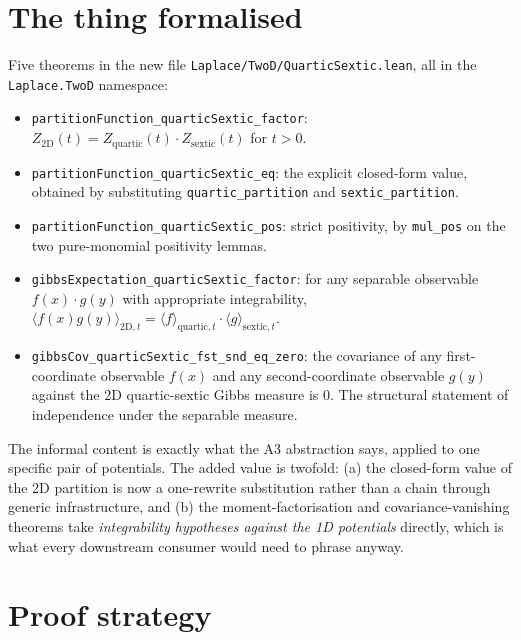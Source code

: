 \documentclass[11pt]{article}
\begin{document}
\section{The thing formalised}

Five theorems in the new file
\texttt{Laplace/TwoD/QuarticSextic.lean}, all in the
\texttt{Laplace.TwoD} namespace:

\begin{itemize}[leftmargin=2em]
\item \texttt{partitionFunction\_quarticSextic\_factor}:
$Z_{\mathrm{2D}}(t) = Z_{\mathrm{quartic}}(t) \cdot Z_{\mathrm{sextic}}(t)$
for $t > 0$.

\item \texttt{partitionFunction\_quarticSextic\_eq}: the explicit
closed-form value, obtained by substituting
\texttt{quartic\_partition} and \texttt{sextic\_partition}.

\item \texttt{partitionFunction\_quarticSextic\_pos}: strict
positivity, by \texttt{mul\_pos} on the two pure-monomial positivity
lemmas.

\item \texttt{gibbsExpectation\_quarticSextic\_factor}: for any
separable observable $f(x) \cdot g(y)$ with appropriate
integrability,
$\langle f(x) g(y) \rangle_{\mathrm{2D}, t}
 = \langle f \rangle_{\mathrm{quartic}, t} \cdot
   \langle g \rangle_{\mathrm{sextic}, t}$.

\item \texttt{gibbsCov\_quarticSextic\_fst\_snd\_eq\_zero}: the
covariance of any first-coordinate observable $f(x)$ and any
second-coordinate observable $g(y)$ against the 2D quartic-sextic
Gibbs measure is $0$. The structural statement of independence under
the separable measure.
\end{itemize}

The informal content is exactly what the A3 abstraction says, applied
to one specific pair of potentials. The added value is twofold: (a)
the closed-form value of the 2D partition is now a one-rewrite
substitution rather than a chain through generic infrastructure, and
(b) the moment-factorisation and covariance-vanishing theorems take
\emph{integrability hypotheses against the 1D potentials} directly,
which is what every downstream consumer would need to phrase anyway.

\section{Proof strategy}
\end{document}
